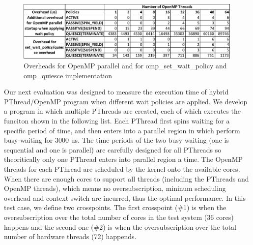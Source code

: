 \begin{figure}[ht]
    \includegraphics[width=0.99\textwidth] {images/parallel_set_quiesce_overhead}
    \caption{Overheads for OpenMP parallel and for {\sf omp\_set\_wait\_policy} and {\sf omp\_quiesce} implementation}
    \label{omp:overhead_table}
\end{figure}


Our next evaluation was designed to measure the execution time of hybrid PThread/OpenMP program when different
wait policies are applied. We develop a program in which multiple PThreads are created, 
each of which executes the funciton shown in the following list. 
Each PThread first spins waiting for a specific period of time, and  
then enters into a parallel region in which perform busy-waiting for 3000 us.
The time periods of the two busy waiting (one is sequential and one is parallel) are carefully designed for
all PThreads so theoritically only one PThread enters into parallel region a time. The 
OpenMP threads for each PThread are scheduled by the kernel onto the available 
cores. When there are enough cores to support all threads (including the PThreads and OpenMP threads),
which means no oversubscription, mininum scheduling overhead and context switch are incurred, thus the optimal 
performance. In this test case, we define two crosspoints. The first crosspoint (\#1) is when the oversubscription
over the total number of cores in the test system (36 cores) happens and the second one (\#2) is when the oversubscription
over the total number of hardware threads (72) happends. 


